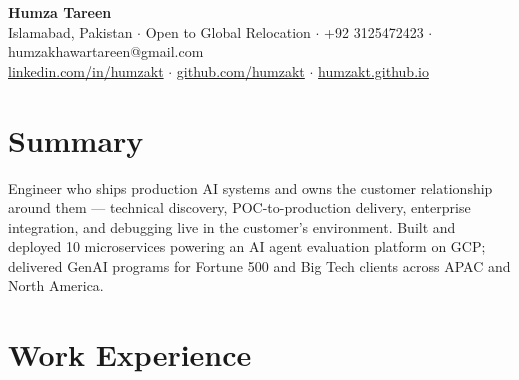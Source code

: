\documentclass[letterpaper]{resume_config}
\begin{document}

\begin{center}
    {\LARGE \textbf{Humza Tareen}} \\ \vspace{2pt}
    {\small Islamabad, Pakistan $\cdot$ Open to Global Relocation $\cdot$ +92 3125472423 $\cdot$ humzakhawartareen@gmail.com} \\
    {\small \href{https://linkedin.com/in/humzakt}{linkedin.com/in/humzakt} $\cdot$ \href{https://github.com/humzakt}{github.com/humzakt} $\cdot$ \href{https://humzakt.github.io}{humzakt.github.io}}
\end{center}

\vspace{-8pt}


\section{Summary}

\noindent Engineer who ships production AI systems and owns the customer relationship around them --- technical discovery, POC-to-production delivery, enterprise integration, and debugging live in the customer's environment. Built and deployed 10 microservices powering an AI agent evaluation platform on GCP; delivered GenAI programs for Fortune 500 and Big Tech clients across APAC and North America.

\vspace{2pt}


\section{Work Experience}
\end{document}

